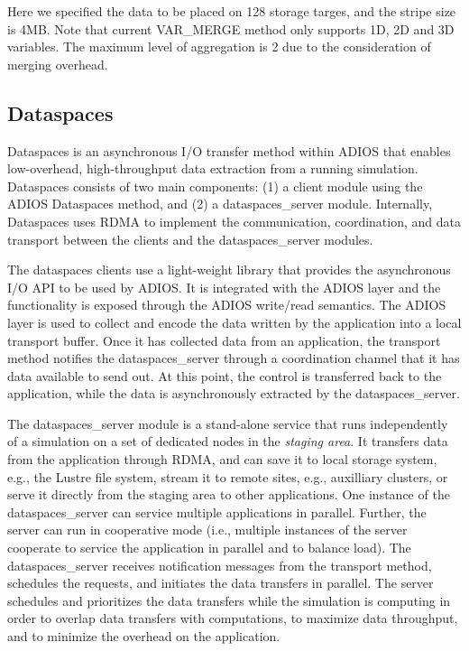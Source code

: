 Here we specified the data to be placed on 128 storage targes, and the stripe
size is 4MB.
Note that current VAR\_MERGE method only supports 1D, 2D and 3D variables.
The maximum level of aggregation is 2 due to the consideration of
merging overhead.  

\subsection{Dataspaces}
\label{section-method-dataspaces}

Dataspaces is an asynchronous I/O transfer method within ADIOS that enables low-overhead, 
high-throughput data extraction from a running simulation. Dataspaces consists of two 
main components: (1) a client module using the ADIOS Dataspaces method, and (2)
a dataspaces\_server module. Internally, 
Dataspaces uses RDMA to implement the communication, coordination, and data transport 
between the clients and the dataspaces\_server modules.

The dataspaces clients use a light-weight library that provides the asynchronous
I/O API to be used by ADIOS. It is integrated with the ADIOS layer and the
functionality is exposed through the ADIOS write/read semantics. 
The ADIOS layer is used to collect and encode the data written 
by the application into a local transport buffer. Once it has collected data from 
an application, the transport method notifies the dataspaces\_server through a coordination channel 
that it has data available to send out. At this point, the control is
transferred back to the application, while the data is asynchronously extracted 
by the dataspaces\_server.

The dataspaces\_server module is a stand-alone service that runs independently of a simulation 
on a set of dedicated nodes in the 
{\em staging area}. It transfers data from the application through RDMA,  
and can save it to local storage system, e.g., the Lustre file system, stream it to 
remote sites, e.g., auxilliary clusters, or serve it directly from the staging area to 
other applications. One instance of the dataspaces\_server can service multiple applications 
 in parallel. Further, the server can run in cooperative mode (i.e., multiple 
instances of the server cooperate to service the application in parallel and to balance 
load). The dataspaces\_server receives notification messages from the transport method, schedules 
the requests, and initiates the data transfers  in parallel. The 
server schedules and prioritizes the data transfers while the simulation is computing 
in order to overlap data transfers with computations, to maximize data throughput, 
and to minimize the overhead on the application.

